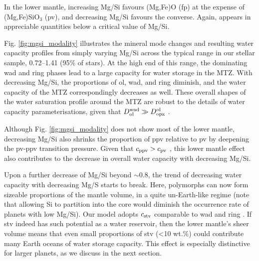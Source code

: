 In the lower mantle, increasing Mg/Si favours (Mg,Fe)O (fp) at the expense of (Mg,Fe)SiO$_3$ (pv), and decreasing Mg/Si favours the converse. Again,  appears in appreciable quantities below a critical value of Mg/Si.

Fig. \ref{fig:mgsi_modality} illustrates the mineral mode changes and resulting water capacity profiles from simply varying Mg/Si across the typical range in our stellar sample, 0.72--1.41 (95\% of stars). At the high end of this range, the dominating wad and ring phases lead to a large capacity for water storage in the MTZ. With decreasing Mg/Si, the proportions of ol, wad, and ring diminish, and the water capacity of the MTZ correspondingly decreases as well. These overall shapes of the water saturation profile around the MTZ are robust to the details of water capacity parameterisations, given that $D^{\rm wad}_{\rm ol} \gg D^{\rm ol}_{\rm opx}$ \citep{bercovici_wholemantle_2003, dong_constraining_2021, andrault_mantle_2022}. 


Although Fig. \ref{fig:mgsi_modality} does not show most of the lower mantle, decreasing Mg/Si also shrinks the proportion of ppv relative to pv by deepening the pv-ppv transition pressure. Given that $c_{\rm ppv} > c_{\rm pv}$ \citep[in the presence of Al;][]{townsend_water_2016}, this lower mantle effect also contributes to the decrease in overall water capacity with decreasing Mg/Si.

Upon a further decrease of Mg/Si beyond $\sim$0.8, the trend of decreasing water capacity with decreasing Mg/S starts to break. Here,  polymorphs can now form sizeable proportions of the mantle volume, in a quite un-Earth-like regime (note that allowing Si to partition into the core would diminish the occurrence rate of planets with low Mg/Si). Our model adopts $c_{\rm stv}$ comparable to wad and ring \citep{panero_hydrogen_2004, litasov_high_2007}. If stv indeed has such potential as a water reservoir, then the lower mantle's sheer volume means that even small proportions of stv (<10 wt.\%) could contribute many Earth oceans of water storage capacity. This effect is especially distinctive for larger planets, as we discuss in the next section.










